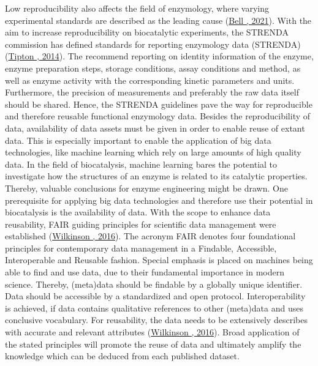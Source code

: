 \documentclass[letterpaper,12pt,english]{jupyterBook}
\begin{document}
\sphinxAtStartPar
Low reproducibility also affects the field of enzymology, where varying experimental standards are described as the leading cause (\hyperlink{cite.references:id42}{Bell , 2021}). With the aim to increase reproducibility on biocatalytic experiments, the STRENDA commission has defined standards for reporting enzymology data (STRENDA) (\hyperlink{cite.references:id11}{Tipton , 2014}). The  recommend reporting on identity information of the enzyme, enzyme preparation steps, storage conditions, assay conditions and method, as well as enzyme activity with the corresponding kinetic parameters and units. Furthermore, the precision of measurements and preferably the raw data itself should be shared. Hence, the STRENDA guidelines pave the way for reproducible and therefore reusable functional enzymology data. Besides the reproducibility of data, availability of data assets must be given in order to enable reuse of extant data. This is especially important to enable the application of big data technologies, like machine learning which rely on large amounts of high quality data. In the field of biocatalysis, machine learning bares the potential to investigate how the structures of an enzyme is related to its catalytic properties. Thereby, valuable conclusions for enzyme engineering might be drawn.
One prerequisite for applying big data technologies and therefore use their potential in biocatalysis is the availability of data. With the scope to enhance data reusability, FAIR guiding principles for scientific data management were established (\hyperlink{cite.references:id40}{Wilkinson , 2016}). The acronym FAIR denotes four foundational principles for contemporary data management in a Findable, Accessible, Interoperable and Reusable fashion. Special emphasis is placed on machines being able to find and use data, due to their fundamental importance in modern science. Thereby, (meta)data should be findable by a globally unique identifier. Data should be accessible by a standardized and open protocol. Interoperability is achieved, if data contains qualitative references to other (meta)data and uses conclusive vocabulary. For reusability, the data needs to be extensively describes with accurate and relevant attributes (\hyperlink{cite.references:id40}{Wilkinson , 2016}). Broad application of the stated principles will promote the reuse of data and ultimately amplify the knowledge which can be deduced from each published dataset.
\end{document}
